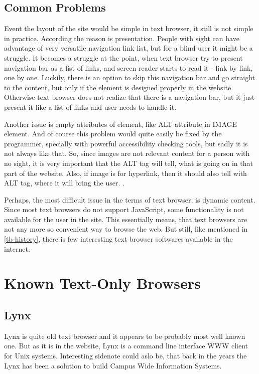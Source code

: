 \subsection[tb-problems]{Common Problems}
Event the layout of the site would be simple in text browser, it still is not simple in practice. According \textcite[Chapter 5]{webbie} the reason is presentation. People with sight can have advantage of very versatile navigation link list, but for a blind user it might be a struggle. It becomes a struggle at the point, when text browser try to present navigation bar as a list of links, and screen reader starts to read it - link by link, one by one. Luckily, there is an option to skip this navigation bar and go straight to the content, but only if the element is designed properly in the website. Otherwise text browser does not realize that there is a navigation bar, but it just present it like a list of links and user needs to handle it.

Another issue is empty attributes of element, like ALT attribute in IMAGE element. And of course this problem would quite easily be fixed by the programmer, specially with powerful accessibility checking tools, but sadly it is not always like that. So, since images are not relevant content for a person with no sight, it is very important that the ALT tag will tell, what is going on in that part of the website. Also, if image is for hyperlink, then it should also tell with ALT tag, where it will bring the user. \parencite[Chapter 5]{webbie}.

Perhaps, the most difficult issue in the terms of text browser, is dynamic content. Since most text browsers do not support JavaScript, some functionality is not available for the user in the site. This essentially means, that text browsers are not any more so convenient way to browse the web. But still, like mentioned in \ref*{tb-history}, there is few interesting text browser softwares available in the internet.

\section[tb-browsers]{Known Text-Only Browsers}
\subsection[tb-lynx]{Lynx}
Lynx is quite old text browser and it appears to be probably most well known one. But as it is in the \textcite{lynx} website, Lynx is a command line interface WWW client for Unix systems. Interesting sidenote could aslo be, that back in the years the Lynx has been a solution to build Campus Wide Information Systems. 
